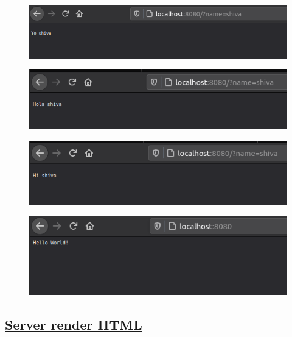 \documentclass[12pt,letterpaper]{article}
\begin{document}
\subsection*{}
\begin{figure}[h]
    \centering
    \includegraphics[width = \textwidth]{Server/op1.png}
\end{figure}
\begin{figure}[h]
    \centering
    \includegraphics[width = \textwidth]{Server/op2.png}
\end{figure}
\begin{figure}[h]
    \centering
    \includegraphics[width = \textwidth]{Server/op3.png}
\end{figure}
\newpage
\begin{figure}[h]
    \centering
    \includegraphics[width = \textwidth]{Server/op4.png}
\end{figure}

\newpage

\subsection*{\underline{\textbf{Server render HTML}}}
\end{document}

